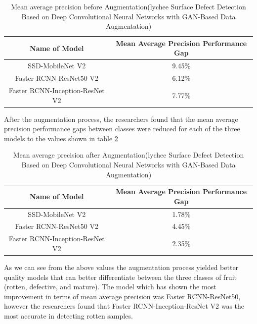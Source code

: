\begin{table}[H]
    \centering
    {\begin{tabular}{|c|c|}
         \hline
         Name of Model
         & Mean Average Precision Performance Gap\\
         \hline
         SSD-MobileNet V2 & 9.45\%\\
         Faster RCNN-ResNet50 V2 & 6.12\%\\
         Faster RCNN-Inception-ResNet V2 & 7.77\%\\
         \hline
        \end{tabular}}
    \caption{Mean average precision before Augmentation(lychee Surface Defect Detection Based on Deep Convolutional
Neural Networks with GAN-Based Data Augmentation)\cite{litReviewLychee}}
    \label{tab: Mean average precision before Augmentation Lychee}
\end{table}
After the augmentation process, the researchers found that the mean average precision performance gaps between classes were reduced for each of the three models to the values shown in table \ref{tab: Mean average precision after Augmentation Lychee}
\begin{table}[H]
    \centering
    {\begin{tabular}{|c|c|}
         \hline
         Name of Model
         & Mean Average Precision Performance Gap\\
         \hline
         SSD-MobileNet V2 & 1.78\%\\
         Faster RCNN-ResNet50 V2 & 4.45\%\\
         Faster RCNN-Inception-ResNet V2 &  2.35\%\\
         \hline
        \end{tabular}}
    \caption{Mean average precision after Augmentation(lychee Surface Defect Detection Based on Deep Convolutional
Neural Networks with GAN-Based Data Augmentation)\cite{litReviewLychee}}
    \label{tab: Mean average precision after Augmentation Lychee}
\end{table}
As we can see from the above values the augmentation process yielded better quality models that can better differentiate between the three classes of fruit (rotten, defective, and mature).  The model which has shown the most improvement in terms of mean average precision was Faster RCNN-ResNet50, however the researchers found that Faster
RCNN-Inception-ResNet V2 was the most accurate in detecting rotten samples.
